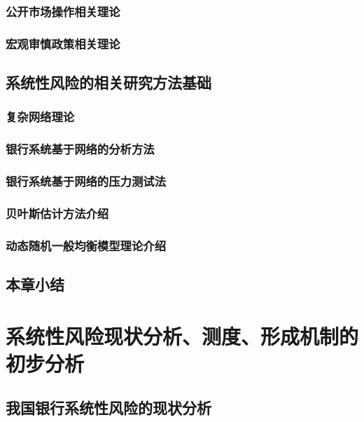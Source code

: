 \subsubsection{公开市场操作相关理论}

\subsubsection{宏观审慎政策相关理论}

\newpage
\subsection{系统性风险的相关研究方法基础}

\subsubsection{复杂网络理论}

\subsubsection{银行系统基于网络的分析方法}

\subsubsection{银行系统基于网络的压力测试法}

\subsubsection{贝叶斯估计方法介绍}

\subsubsection{动态随机一般均衡模型理论介绍}

\newpage
\subsection{本章小结}

\newpage
\section{系统性风险现状分析、测度、形成机制的初步分析}

\newpage
\subsection{我国银行系统性风险的现状分析}

